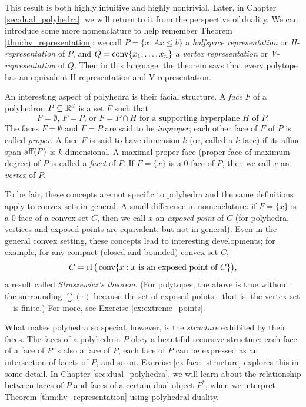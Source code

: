 
This result is both highly intuitive and highly nontrivial. Later, in Chapter
\ref{sec:dual_polyhedra}, we will return to it from the perspective of
duality. We can introduce some more nomenclature to help remember Theorem    
\ref{thm:hv_representation}: we call $P = \{x : Ax \leq b\}$ a \emph{halfspace
  representation} or \emph{H-representation} of $P$, and $Q =
\operatorname{conv}\{x_1,\dots,x_n\}$ a \emph{vertex representation} or
\emph{V-representation} of $Q$. Then in this language, the theorem   
says that every polytope has an equivalent H-representation and
V-representation.   

An interesting aspect of polyhedra is their facial structure. A \emph{face} $F$
of a polyhedron $P \subseteq \mathbb{R}^d$ is a set $F$ such that 
\[
\text{$F = \emptyset$, $F = P$, or $F = P \cap H$ for a supporting hyperplane
  $H$ of $P$}. 
\]
The faces $F=\emptyset$ and $F=P$ are said to be \emph{improper}; each other
face of $F$ of $P$ is called \emph{proper}. A face $F$ is said to have dimension
$k$ (or, called a $k$-face) if its affine span $\operatorname{aff}(F)$ is $k$-dimensional. A
maximal proper face (proper face of maximum degree) of $P$ is called a
\emph{facet} of $P$. If $F=\{x\}$ is a $0$-face of $P$, then we call $x$ an
\emph{vertex} of $P$. 

To be fair, these concepts are not specific to polyhedra and the same
definitions apply to convex sets in general. A small difference in
nomenclature: if $F = \{x\}$ is a $0$-face of a convex set $C$, then we call $x$
an \emph{exposed point} of $C$ (for polyhedra, vertices and exposed points 
are equivalent, but not in general). Even in the general convex setting, these
concepts lead to interesting developments; for example, for any compact (closed
and bounded) convex set $C$, 
\[
C = \operatorname{cl}\big(\operatorname{conv}\{x : \text{$x$ is an exposed point of $C$}\}\big),  
\]
a result called \emph{Straszewicz's theorem}. (For polytopes, the above is true 
without the surrounding $\closure(\cdot)$ because the set of exposed
points---that is, the vertex set---is finite.) For more, see Exercise
\ref{ex:extreme_points}. 

What makes polyhedra so special, however, is the \emph{structure} exhibited by
their faces. The faces of a polyhedron $P$ obey a beautiful recursive 
structure: each face of a face of $P$ is also a face of $P$, each face of $P$
can be expressed as an intersection of facets of $P$, and so on. 
Exercise \ref{ex:face_structure} explores this in some detail. In Chapter
\ref{sec:dual_polyhedra}, we will learn about the relationship between faces of
$P$ and faces of a certain dual object $P^*$, when we interpret Theorem
\ref{thm:hv_representation} using polyhedral duality.   

